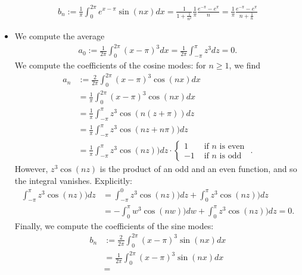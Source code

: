 \documentclass[11pt]{article}
\begin{document}
\begin{solution}
\begin{itemize}
\begin{align*}
            b_n:= \frac{1}{\pi}
                    \int_{0}^{2\pi} e^{x - \pi} \sin(n x) dx = \frac{1}{1 + \frac{1}{n^2}} \frac{1}{\pi}\frac{e^{-\pi} - e^{\pi}}{n} = \frac{1}{\pi}  \frac{e^{-\pi} - e^{\pi}}{n + \frac{1}{n}}
        \end{align*}
    \item
    We compute the average 
    \begin{align*}
        a_0
        :=
        \frac{1}{2\pi} \int_{0}^{2\pi} (x-\pi)^{3} dx
        =
        \frac{1}{2\pi} \int_{-\pi}^{\pi} z^{3} dz
        =
        0
        .
    \end{align*}
    We compute the coefficients of the cosine modes: for $n \geq 1$, we find 
    \begin{align*}
        a_n
        &:=
        \frac{2}{2\pi} \int_{0}^{2\pi} (x-\pi)^{3} \cos(nx) dx
        \\&=
        \frac{1}{\pi} \int_{0}^{2\pi} (x-\pi)^{3} \cos(nx) dx
        \\&=
        \frac{1}{\pi} \int_{-\pi}^{\pi} z^{3} \cos(n(z+\pi)) dz
        \\&=
        \frac{1}{\pi} \int_{-\pi}^{\pi} z^{3} \cos(nz+n\pi)) dz
        \\&=
        \frac{1}{\pi} \int_{-\pi}^{\pi} z^{3} \cos(nz)) dz
        \cdot \left\{\begin{array}{ll} 1 & \text{ if $n$ is even } \\ -1 & \text{ if $n$ is odd } \end{array}\right.
        .
    \end{align*}
    However, $z^3 \cos(nz)$ is the product of an odd and an even function, and so the integral vanishes. 
    Explicitly:
    \begin{align*}
        \int_{-\pi}^{\pi} z^{3} \cos(nz)) dz
        &=
        \int_{-\pi}^{0} z^{3} \cos(nz)) dz
        + 
        \int_{0}^{\pi} z^{3} \cos(nz)) dz
        \\&=
        - 
        \int_{0}^{\pi} w^{3} \cos(nw)) dw
        + 
        \int_{0}^{\pi} z^{3} \cos(nz)) dz
        = 
        0.
    \end{align*}
    Finally, we compute the coefficients of the sine modes:
    \begin{align*}
        b_n
        &:=
        \frac{2}{2\pi} \int_{0}^{2\pi} (x-\pi)^{3} \sin(nx) dx
        \\&=
        \frac{1}{2\pi} \int_{0}^{2\pi} (x-\pi)^{3} \sin(nx) dx
        \\&=

\end{align*}
\end{itemize}
\end{solution}
\end{document}

